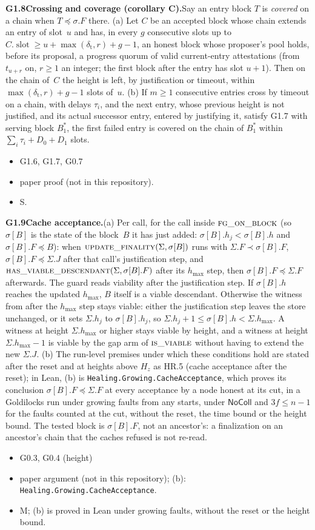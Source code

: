 \documentclass{article}
\newcommand{\slot}{\operatorname{slot}}
\newcommand{\hmax}{h_{\max}}
\newcommand{\fname}[1]{\text{\textsc{#1}}}
\newcommand{\dagnode}[6]{%
\par\medskip\noindent\textbf{#1\enspace #2.}\enspace #3
\begin{itemize}[leftmargin=2.2em,itemsep=0pt,topsep=2pt]
\item[\emph{Uses}] #4
\item[\emph{Evid.}] #5
\item[\emph{Task}] #6
\end{itemize}}
\begin{document}
\dagnode{G1.8}{Crossing and coverage (corollary C)}{Say an entry block $T$
is \emph{covered} on a chain when $T\preceq\sigma.F$ there.  (a) Let $C$ be an
accepted block whose chain extends an entry of slot~$u$ and has, in every $g$
consecutive slots up to $C.\slot\geq u+\max(\delta_{\mathrm t},r)+g-1$, an
honest block whose proposer's pool holds, before its proposal, a progress
quorum of valid current-entry attestations (from $t_{u+r}$ on, $r\geq1$ an integer;
the first block after the entry has slot $u+1$).  Then
on the chain of~$C$ the height is left, by justification or timeout, within
$\max(\delta_{\mathrm t},r)+g-1$ slots of~$u$.  (b) If $m\geq1$ consecutive
entries cross by timeout on a chain, with delays $\tau_i$, and the next
entry, whose previous height is not justified, and its actual successor entry, entered by justifying it, satisfy G1.7 with serving block
$B^*_1$, the first failed entry is covered on the chain of $B^*_1$ within
$\sum_i\tau_i+D_0+D_1$ slots.}
{G1.6, G1.7, G0.7}{paper proof (not in this repository).}{S.}

\dagnode{G1.9}{Cache acceptance}{(a) Per call, for the call inside
$\fname{fg\_on\_block}$ (so $\sigma[B]$ is the state of the block~$B$ it has just
added: $\sigma[B].h_j<\sigma[B].h$ and $\sigma[B].F\preceq B$): when
$\fname{update\_finality}(\Sigma,\sigma[B])$ runs with
$\Sigma.F\prec\sigma[B].F$, $\sigma[B].F\preceq\Sigma.J$ after that call's
justification step, and $\fname{has\_viable\_descendant}(\Sigma,\sigma[B].F)$
after its $\hmax$ step, then $\sigma[B].F\preceq\Sigma.F$ afterwards.
The guard reads viability after the justification step.  If $\sigma[B].h$
reaches the updated $\hmax$, $B$ itself is a viable descendant.  Otherwise
the witness from after the $\hmax$ step stays viable: either the justification
step leaves the store unchanged, or it sets $\Sigma.h_j$ to $\sigma[B].h_j$,
so $\Sigma.h_j+1\leq\sigma[B].h<\Sigma.\hmax$.  A witness at height
$\Sigma.\hmax$ or higher stays viable by height, and a witness at height
$\Sigma.\hmax-1$ is viable by the gap arm of $\fname{is\_viable}$ without
having to extend the new $\Sigma.J$.  (b) The
run-level premises under which these conditions hold are stated after the reset
and at heights above $H_z$ as HR.5 (cache acceptance after the reset); in
Lean, (b) is \texttt{Healing.Growing.CacheAcceptance}, which proves its
conclusion $\sigma[B].F\preceq\Sigma.F$ at every acceptance by a node honest
at its cut, in a Goldilocks run under growing faults from any starts, under
$\mathsf{NoColl}$ and $3f\leq n-1$ for the faults counted at the cut, without
the reset, the time bound or the height bound.  The tested block is $\sigma[B].F$, not an ancestor's:
a finalization on an ancestor's chain that the caches refused is not re-read.}
{G0.3, G0.4 (height)}{paper argument (not in this repository); (b):
\texttt{Healing.Growing.CacheAcceptance}.}{M; (b) is proved in Lean under
growing faults, without the reset or the height bound.}
\end{document}
